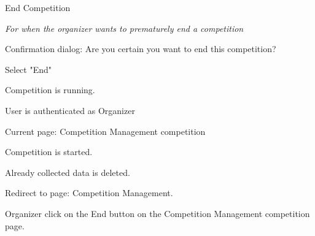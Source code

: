
\begin{uc}{End Competition}

	\emph{For when the organizer wants to prematurely end a competition}
    \begin{uc-mss}
    \item Confirmation dialog: Are you certain you want to end this competition?
    \item Select "End"
    \end{uc-mss}

    \begin{uc-pre}
    \item Competition is running.
    \item User is authenticated as Organizer
    \item Current page: Competition Management {competition}
    \end{uc-pre}

    \begin{uc-post}
    \item Competition is started.
    \item Already collected data is deleted.
    \item Redirect to page: Competition Management.
    \end{uc-post}

    \begin{uc-trig}
        Organizer click on the End button on the Competition Management {competition} page.
    \end{uc-trig}

\end{uc}
